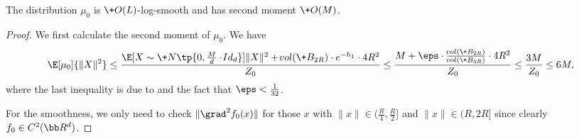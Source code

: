 \begin{lemma}\label{lem:propertymu0}
    The distribution $\mu_0$ is $\+O(L)$-log-smooth and has second moment $\+O(M)$.
\end{lemma}
\begin{proof}
    We first calculate the second moment of $\mu_0$. We have
    $$
        \E[\mu_0]{\|X\|^2} \leq \frac{\E[X\sim \+N\tp{0,\frac{M}{d}\cdot \!{Id}_d}]{\|X\|^2} + \vol (\+B_{2R})\cdot e^{-h_1}\cdot 4R^2}{Z_0} \leq \frac{M + \eps\cdot \frac{\vol (\+B_{2R})}{\vol (\+B_{3R})}\cdot 4R^2}{Z_0} \leq \frac{3M}{Z_0}\leq 6M,
    $$
    where the last inequality is due to  and the fact that $\eps<\frac{1}{32}$.

    For the smoothness, we only need to check $\|\grad^2 f_0(x)\|$ for those $x$ with $\|x\|\in (\frac{R}{4},\frac{R}{2}]$ and $\|x\|\in (R,2R]$ since clearly $f_0\in C^2(\bb R^d)$. %


\end{proof}
